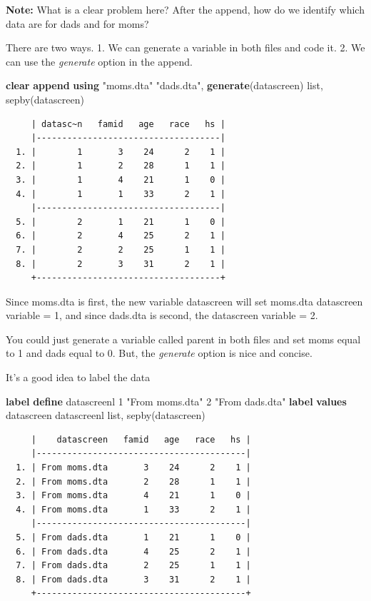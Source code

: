 \documentclass[
]{book}
\newenvironment{Shaded}{\begin{snugshade}}{\end{snugshade}}
\newcommand{\KeywordTok}[1]{\textcolor[rgb]{0.13,0.29,0.53}{\textbf{#1}}}
\newcommand{\NormalTok}[1]{#1}
\newcommand{\OtherTok}[1]{\textcolor[rgb]{0.56,0.35,0.01}{#1}}
\newcommand{\StringTok}[1]{\textcolor[rgb]{0.31,0.60,0.02}{#1}}
\begin{document}
\textbf{Note:} What is a clear problem here? After the append, how do we identify which data are for dads and for moms?

There are two ways.
1. We can generate a variable in both files and code it.
2. We can use the \emph{generate} option in the append.

\begin{Shaded}
\begin{Highlighting}[]
\KeywordTok{clear}
\KeywordTok{append} \KeywordTok{using} \StringTok{"moms.dta"} \StringTok{"dads.dta"}\NormalTok{, }\KeywordTok{generate}\NormalTok{(datascreen)}
\OtherTok{list}\NormalTok{, sepby(datascreen)}
\end{Highlighting}
\end{Shaded}

\begin{verbatim}
     | datasc~n   famid   age   race   hs |
     |------------------------------------|
  1. |        1       3    24      2    1 |
  2. |        1       2    28      1    1 |
  3. |        1       4    21      1    0 |
  4. |        1       1    33      2    1 |
     |------------------------------------|
  5. |        2       1    21      1    0 |
  6. |        2       4    25      2    1 |
  7. |        2       2    25      1    1 |
  8. |        2       3    31      2    1 |
     +------------------------------------+
\end{verbatim}

Since moms.dta is first, the new variable datascreen will set moms.dta datascreen variable = 1, and since dads.dta is second, the datascreen variable = 2.

You could just generate a variable called parent in both files and set moms equal to 1 and dads equal to 0. But, the \emph{generate} option is nice and concise.

It's a good idea to label the data

\begin{Shaded}
\begin{Highlighting}[]
\KeywordTok{label} \KeywordTok{define}\NormalTok{ datascreenl 1 }\StringTok{"From moms.dta"}\NormalTok{ 2 }\StringTok{"From dads.dta"}
\KeywordTok{label} \KeywordTok{values}\NormalTok{ datascreen datascreenl}
\OtherTok{list}\NormalTok{, sepby(datascreen)}
\end{Highlighting}
\end{Shaded}

\begin{verbatim}
     |    datascreen   famid   age   race   hs |
     |-----------------------------------------|
  1. | From moms.dta       3    24      2    1 |
  2. | From moms.dta       2    28      1    1 |
  3. | From moms.dta       4    21      1    0 |
  4. | From moms.dta       1    33      2    1 |
     |-----------------------------------------|
  5. | From dads.dta       1    21      1    0 |
  6. | From dads.dta       4    25      2    1 |
  7. | From dads.dta       2    25      1    1 |
  8. | From dads.dta       3    31      2    1 |
     +-----------------------------------------+
\end{verbatim}
\end{document}
